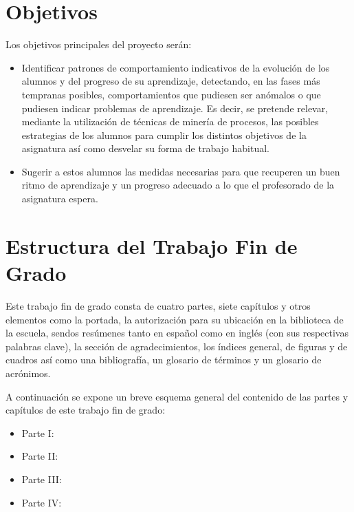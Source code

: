 \section{Objetivos}

Los objetivos principales del proyecto serán:
\begin{itemize}
\item Identificar patrones de comportamiento indicativos de la evolución de los alumnos y del progreso de su aprendizaje, detectando, en las fases más tempranas posibles, comportamientos que pudiesen ser anómalos o que pudiesen indicar problemas de aprendizaje. Es decir, se pretende relevar, mediante la utilización de técnicas de minería de procesos, las posibles estrategias de los alumnos para cumplir los distintos objetivos de la asignatura así como desvelar su forma de trabajo habitual.
\item Sugerir a estos alumnos las medidas necesarias para que recuperen un buen ritmo de aprendizaje y un progreso adecuado a lo que el profesorado de la asignatura espera.
\end{itemize}

\section{Estructura del Trabajo Fin de Grado}

Este trabajo fin de grado consta de cuatro partes, siete capítulos y otros elementos como la portada, la autorización para su ubicación en la biblioteca de la escuela, sendos resúmenes tanto en español como en inglés (con sus respectivas palabras clave), la sección de agradecimientos, los índices general, de figuras y de cuadros así como una bibliografía, un glosario de términos y un glosario de acrónimos.

A continuación se expone un breve esquema general del contenido de las partes y capítulos de este trabajo fin de grado:

\begin{itemize}
\item Parte I:
\item Parte II:
\item Parte III:
\item Parte IV:
\end{itemize}